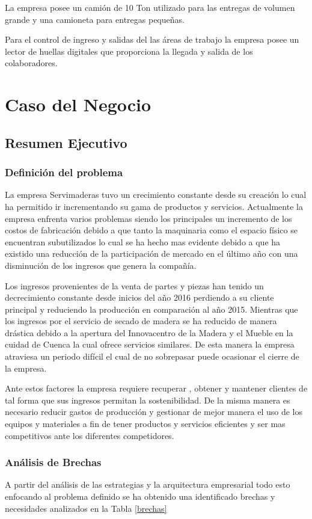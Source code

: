 \documentclass[12pt, a4paper]{article}
\begin{document}
La empresa posee un camión de 10 Ton utilizado para las entregas de volumen grande y una camioneta para entregas pequeñas. 

Para el control de ingreso y salidas del las áreas de trabajo la empresa posee un lector de huellas digitales que proporciona la llegada y salida de los colaboradores.


\newpage
\section{Caso del Negocio}
\subsection{Resumen Ejecutivo}
\subsubsection{Definición del problema}

La empresa Servimaderas tuvo un crecimiento constante desde su creación lo cual ha permitido  ir incrementando su gama de productos y servicios. Actualmente la empresa enfrenta varios problemas siendo los principales un incremento de los costos de fabricación debido a que tanto la maquinaria como el espacio físico se encuentran subutilizados lo cual se ha hecho mas evidente debido a que ha existido una reducción de la participación de mercado en el último año con una disminución de los ingresos que genera la compañía. 

Los ingresos provenientes de la venta de partes y piezas han tenido un decrecimiento constante desde inicios del año 2016 perdiendo a su cliente principal y reduciendo la producción en comparación al año 2015. Mientras que los ingresos por el servicio de secado de madera se ha reducido de manera drástica debido a la apertura del Innovacentro de la Madera y el Mueble en la cuidad de Cuenca la cual ofrece servicios similares. De esta manera la empresa atraviesa un periodo difícil el cual de no sobrepasar puede ocasionar el cierre de la empresa. 

Ante estos factores la empresa requiere recuperar , obtener y mantener clientes de tal forma que sus ingresos permitan la sostenibilidad. De la misma manera es necesario reducir gastos de producción y gestionar de mejor manera el uso de los equipos y materiales a fin de tener productos y servicios eficientes y ser mas competitivos ante los diferentes competidores.

\subsubsection{Análisis de Brechas}
A partir del análisis de las estrategias y la arquitectura empresarial todo esto enfocando  al problema definido se ha obtenido una identificado  brechas y necesidades analizados en la Tabla \ref{brechas}
\end{document}
